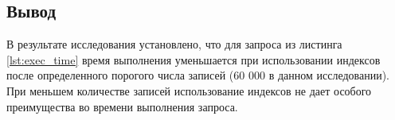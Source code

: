 \subsection{Вывод}

В результате исследования установлено, что для запроса из листинга \ref{lst:exec_time} время выполнения уменьшается при использовании индексов после определенного порогого числа записей (60 000 в данном исследовании). При меньшем количестве записей использование индексов не дает особого преимущества во времени выполнения запроса.

\pagebreak